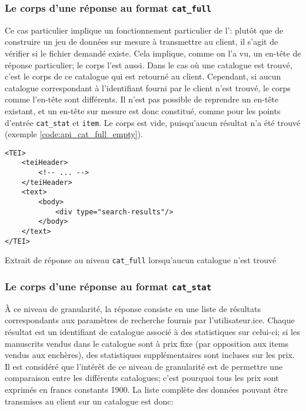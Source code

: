 \subsubsection{Le corps d'une réponse au format \texttt{cat\_full}}
Ce cas particulier implique un fonctionnement particulier de l'\api{}: plutôt que de construire un jeu de données sur mesure à transmettre au client, il s'agit de vérifier si le fichier demandé existe. Cela implique, comme on l'a vu, un en-tête de réponse particulier; le corps l'est aussi. Dans le cas où une catalogue est trouvé, c'est le corps de ce catalogue qui est retourné au client. Cependant, si aucun catalogue correspondant à l'identifiant fourni par le client n'est trouvé, le corps comme l'en-tête sont différents. Il n'est pas possible de reprendre un en-tête existant, et un en-tête sur mesure est donc constitué, comme pour les points d'entrée \texttt{cat\_stat} et \texttt{item}. Le corps est vide, puisqu'aucun résultat n'a été trouvé (exemple \ref{code:api_cat_full_empty}).

\begin{listing}[h!]
	\begin{verbatim}
<TEI>
	<teiHeader>
		<!-- ... -->
	</teiHeader>
	<text>
		<body>
			<div type="search-results"/>
		</body>
	</text>
</TEI>
	\end{verbatim}
	\caption{Extrait de réponse au niveau \texttt{cat\_full} lorsqu'aucun catalogue n'est trouvé}
	\label{code:api_cat_full_empty}
\end{listing}

\subsubsection{Le corps d'une réponse au format \texttt{cat\_stat}}
À ce niveau de granularité, la réponse consiste en une liste de résultats correspondants aux paramètres de recherche fournis par l'utilisateur.ice. Chaque résultat est un identifiant de catalogue associé à des statistiques sur celui-ci; si les manuscrits vendus dans le catalogue sont à prix fixe (par opposition aux items vendus aux enchères), des statistiques supplémentaires sont incluses sur les prix. Il est considéré que l'intérêt de ce niveau de granularité est de permettre une comparaison entre les différents catalogues; c'est pourquoi tous les prix sont exprimés en francs constants 1900. La liste complète des données pouvant être transmises au client sur un catalogue est donc:

